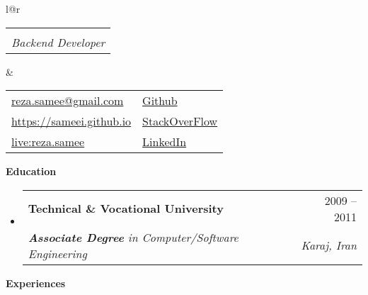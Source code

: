 \documentclass[letterpaper,12pt]{article}[leftmargin=*]
\makeatletter
\def \fullname {Reza Sameei}
\def \subtitle {Backend Developer}
\def \linkedinicon {\faLinkedin}
\def \linkedinlink {http://linkedin.com/in/reza-sameei/}
\def \linkedintext {LinkedIn}
\def \phoneicon {\faPhone}
\def \phonetext {+98-912-666-2695}
\def \skypeicon {\faSkype}
\def \skypelink {https://join.skype.com/invite/nINGOAMPxZdX}
\def \skypename {live:reza.samee}
\def \emailicon {\faEnvelope}
\def \emaillink {mailto:reza.samee@gmail.com}
\def \emailtext {reza.samee@gmail.com}
\def \githubicon {\faGithub}
\def \githublink {https://github.com/sameei}
\def \githubtext {Github}
\def \stacksiteicon {\faStackOverflow}
\def \stacksitelink {https://stackoverflow.com/users/998642/reza-sameei}
\def \stacksitetext {StackOverFlow}
\def \websiteicon {\faGlobe}
\def \websitelink {https://sameei.github.io/}
\def \websitetext {https://sameei.github.io}
\def \headertype {\doublecol} %
\def \entryspacing {-0pt}
\def \linkedin {\linkedinicon \hspace{3pt}\href{\linkedinlink}{\linkedintext}}
\def \phone {\phoneicon \hspace{3pt}{ \phonetext}}
\def \skype {\skypeicon \hspace{3pt}\href{\skypelink}{\skypename}}
\def \email {\emailicon \hspace{3pt}\href{\emaillink}{\emailtext}}
\def \github {\githubicon \hspace{3pt}\href{\githublink}{\githubtext}}
\def \stackoverflow {\stacksiteicon \hspace{3pt}\href{\stacksitelink}{\stacksitetext}}
\def \website {\websiteicon \hspace{3pt}\href{\websitelink}{\websitetext}}
\renewcommand{\section}[2]{\vspace{5pt}
  \colorbox{secondary}{\color{white}\raggedbottom\normalsize\textbf{{#1}{\hspace{7pt}#2}}}
}
\newcommand{\resumeEntryStart}{\begin{itemize}[leftmargin=2.5mm]}
\newcommand{\resumeEntryEnd}{\end{itemize}\vspace{\entryspacing}}
\newcommand{\resumeEntryTSDL}[4]{
  \vspace{-1pt}\item[]
    \begin{tabular*}{0.97\textwidth}{l@{\extracolsep{\fill}}r}
      \textbf{\color{primary}#1} & {\firabook\color{accent}\small#2} \\
      \textit{\color{accent}\small#3} & \textit{\color{accent}\small#4} \\
    \end{tabular*}\vspace{-6pt}
}
\newcommand{\resumeEntryS}[2]{
  \item[]\small{
    \textbf{\color{primary}#1 }{ #2 \vspace{-6pt}}
  }
}
\newcommand{\doublecol}[6]{
  \begin{tabular*}{\textwidth}{l@{\extracolsep{\fill}}r}
    {
      \begin{tabular}[c]{l}
        \fontsize{35}{45}\selectfont{\color{primary}{{\textbf{\fullname}}}}
		\\
        {\textit{\subtitle}} %
      \end{tabular}
    } & {
      \begin{tabular}[c]{l@{\hspace{1.5em}}l}
        {\small#4} & {\small#1} \\
        {\small#5} & {\small#2} \\
        {\small#6} & {\small#3}
      \end{tabular}
    }
  \end{tabular*}
}
\newcommand{\singlecol}[6]{
  \begin{tabular*}{\textwidth}{l@{\extracolsep{\fill}}r}
    {
      \begin{tabular}[b]{l}
        \fontsize{35}{45}\selectfont{\color{primary}{{\textbf{\fullname}}}} \\
        {\textit{\subtitle}} %
      \end{tabular}
    } & {
      \begin{tabular}[c]{l}
        {\small#1} \\
        {\small#2} \\
        {\small#3} \\
        {\small#4} \\
        {\small#5} \\
        {\small#6}
      \end{tabular}
    }
  \end{tabular*}
}
\makeatother
\begin{document}


\headertype{\github}{\stackoverflow}{\linkedin}{\email}{\website}{\skype}{} %





\section{\faGraduationCap}{Education}

  \resumeEntryStart
    \resumeEntryTSDL
      {Technical \& Vocational University}{2009 -- 2011}
      {\textbf{Associate Degree} in Computer/Software Engineering}{Karaj, Iran}
  \resumeEntryEnd

 \section{\faBicycle}{Experiences}
\end{document}
